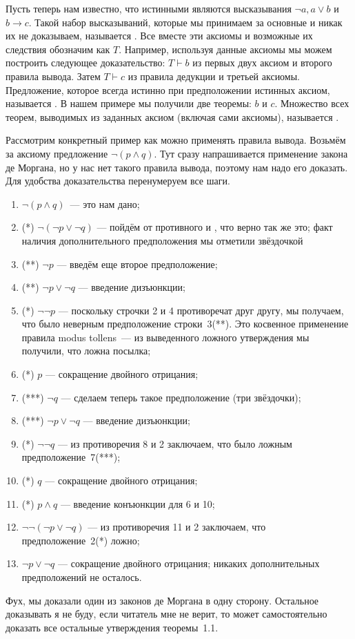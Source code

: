Пусть теперь нам известно, что истинными являются высказывания $\neg a, a\lor b$ и $b\to c$. Такой набор высказываний, которые мы принимаем за основные и никак их не доказываем, называется . Все вместе эти аксиомы и возможные их следствия обозначим как $T$. Например, используя данные аксиомы мы можем построить следующее доказательство: $T\vdash b$ из первых двух аксиом и второго правила вывода. Затем $T\vdash c$ из правила дедукции и третьей аксиомы. Предложение, которое всегда истинно при предположении истинных аксиом, называется . В нашем примере мы получили две теоремы: $b$ и $c$. Множество всех теорем, выводимых из заданных аксиом (включая сами аксиомы), называется .

\begin{example}
Рассмотрим конкретный пример как можно применять правила вывода. Возьмём за аксиому предложение $\neg (p\land q)$. Тут сразу напрашивается применение закона де Моргана, но у нас нет такого правила вывода, поэтому нам надо его доказать. Для удобства доказательства перенумеруем все шаги.
\begin{enumerate}
\item $\neg (p\land q)$~--- это нам дано;
\item (*) $\neg (\neg p \lor \neg q)$ --- пойдём от противного и , что верно так же это; факт наличия дополнительного предположения мы отметили звёздочкой
\item (**) $\neg p$ --- введём еще второе предположение;
\item (**) $\neg p \lor \neg q$ --- введение  дизъюнкции;
\item (*) $\neg \neg p$ --- поскольку строчки 2 и 4 противоречат друг другу, мы получаем, что было неверным предположение строки~3(**). Это косвенное применение правила modus tollens~--- из выведенного ложного утверждения мы получили, что ложна посылка;
\item (*) $p$ --- сокращение двойного отрицания;
\item (***) $\neg q$ --- сделаем теперь такое предположение (три звёздочки);
\item (***) $\neg p \lor \neg q$ --- введение дизъюнкции;
\item (*) $\neg \neg q$ --- из противоречия 8 и 2 заключаем, что было ложным предположение~7(***);
\item (*) $q$ --- сокращение двойного отрицания;
\item (*) $p\land q$ --- введение конъюнкции для 6 и 10;
\item $\neg\neg(\neg p\lor \neg q)$ --- из противоречия 11 и 2 заключаем, что предположение~2(*) ложно;
\item $\neg p\lor \neg q$ --- сокращение двойного отрицания; никаких дополнительных предположений не осталось.
\end{enumerate}
Фух, мы доказали один из законов де Моргана в одну сторону. Остальное доказывать я не буду, если читатель мне не верит, то может самостоятельно доказать все остальные утверждения теоремы~1.1.
\end{example}


